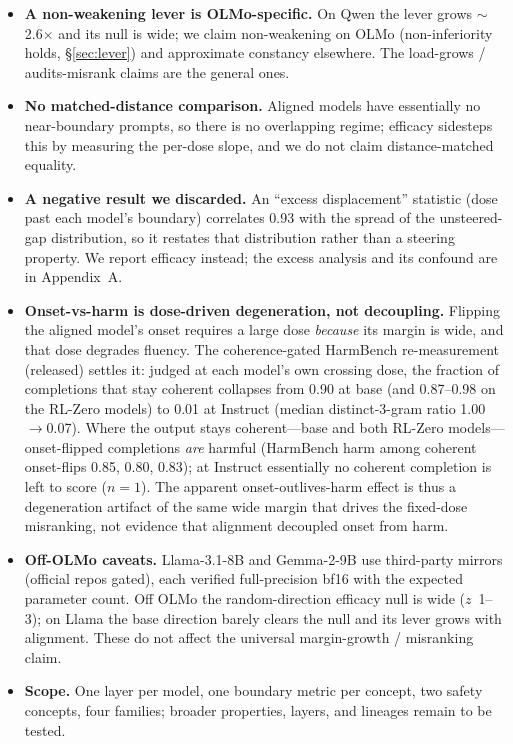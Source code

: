 \documentclass[11pt]{article}
\newcommand{\x}{$\times$}
\begin{document}
\begin{itemize}\itemsep2pt
\item \textbf{A non-weakening lever is OLMo-specific.} On Qwen the lever grows $\sim$\num{2.6}\x{}
  and its null is wide; we claim non-weakening on OLMo (non-inferiority holds, \S\ref{sec:lever}) and approximate constancy elsewhere. The
  load-grows / audits-misrank claims are the general ones.
\item \textbf{No matched-distance comparison.} Aligned models have essentially no near-boundary
  prompts, so there is no overlapping regime; efficacy sidesteps this by measuring the per-dose
  slope, and we do not claim distance-matched equality.
\item \textbf{A negative result we discarded.} An ``excess displacement'' statistic (dose past each
  model's boundary) correlates \num{0.93} with the spread of the unsteered-gap distribution, so it
  restates that distribution rather than a steering property. We report efficacy instead; the excess
  analysis and its confound are in Appendix~A.
\item \textbf{Onset-vs-harm is dose-driven degeneration, not decoupling.} Flipping the aligned
  model's onset requires a large dose \emph{because} its margin is wide, and that dose degrades
  fluency. The coherence-gated HarmBench re-measurement (released) settles it: judged at each model's
  own crossing dose, the fraction of completions that stay coherent collapses from \num{0.90} at base
  (and \num{0.87}--\num{0.98} on the RL-Zero models) to \num{0.01} at Instruct (median distinct-3-gram
  ratio \num{1.00}$\rightarrow$\num{0.07}). Where the output stays coherent---base and both RL-Zero
  models---onset-flipped completions \emph{are} harmful (HarmBench harm among coherent onset-flips
  \num{0.85}, \num{0.80}, \num{0.83}); at Instruct essentially no coherent completion is left to score
  ($n{=}1$). The apparent onset-outlives-harm effect is thus a degeneration artifact of the same wide
  margin that drives the fixed-dose misranking, not evidence that alignment decoupled onset from harm.
\item \textbf{Off-OLMo caveats.} Llama-3.1-8B and Gemma-2-9B use third-party mirrors (official repos
  gated), each verified full-precision bf16 with the expected parameter count. Off OLMo the
  random-direction efficacy null is wide ($z$~1--3); on Llama the base direction barely clears the
  null and its lever grows with alignment. These do not affect the universal margin-growth /
  misranking claim.
\item \textbf{Scope.} One layer per model, one boundary metric per concept, two safety concepts,
  four families; broader properties, layers, and lineages remain to be tested.
\end{itemize}
\end{document}
